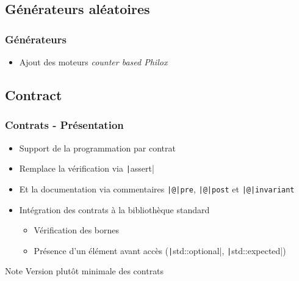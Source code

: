 \documentclass[C++.tex]{subfiles}
\begin{document}
\subsection*{Générateurs aléatoires}
\begin{frame}[fragile]
	\frametitle{Générateurs}
	\begin{itemize}
		\item Ajout des moteurs \textit{counter based Philox}
	\end{itemize}

\end{frame}

\subsection*{Contract}
\begin{frame}[fragile]
	\frametitle{Contrats - Présentation}
	\begin{itemize}
		\item Support de la programmation par contrat
		\item Remplace la vérification via \texttt|assert|
		\item Et la documentation via commentaires \texttt{|@|pre}, \texttt{|@|post} et \texttt{|@|invariant}
		\item Intégration des contrats à la bibliothèque standard
		\begin{itemize}
			\item Vérification des bornes
			\item Présence d'un élément avant accès (\texttt|std::optional|, \texttt|std::expected|)
		\end{itemize}
	\end{itemize}

	\begin{block}{Note}
		Version plutôt minimale des contrats
	\end{block}

\end{frame}
\end{document}
